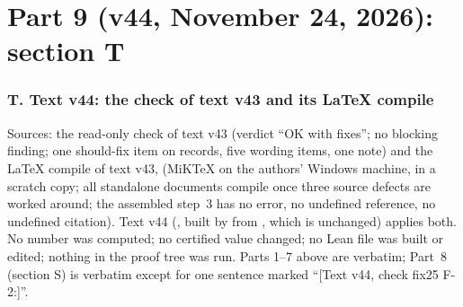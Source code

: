 \part*{Part 9 (v44, November 24, 2026): section T}
\section*{T. Text v44: the check of text v43 and its LaTeX compile}
Sources: the read-only check  of text v43 (verdict ``OK with fixes''; no blocking finding; one should-fix item on records, five wording items, one note) and the LaTeX compile of text v43,  (MiKTeX on the authors' Windows machine, in a scratch copy; all standalone documents compile once three source defects are worked around; the assembled step~3 has no error, no undefined reference, no undefined citation). Text v44 (, built by  from , which is unchanged) applies both. No number was computed; no certified value changed; no Lean file was built or edited; nothing in the proof tree was run. Parts 1--7 above are verbatim; Part~8 (section S) is verbatim except for one sentence marked ``[Text v44, check fix25 F-2:]''.
